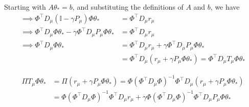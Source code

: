Starting with \( A \theta_{*} = b \), and substituting the definitions of \( A \) and \( b \), we have
\begin{align*}
    \implies
    \Phi^{\top} D_{\mu}\left(\mathbb{I}-\gamma P_{\mu}\right) \Phi \theta_{*}
     & =
    \Phi^{\top} D_{\mu} r_{\mu}
    \\
    \implies
    \Phi^{\top} D_{\mu} \Phi \theta_{*} - \gamma \Phi^{\top} D_{\mu} P_{\mu} \Phi \theta_{*}
     & =
    \Phi^{\top} D_{\mu} r_{\mu}
    \\
    \implies
    \Phi^{\top} D_{\mu} \Phi \theta_{*}
     & =
    \Phi^{\top} D_{\mu} r_{\mu} + \gamma \Phi^{\top} D_{\mu} P_{\mu} \Phi \theta_{*}
    \\ & =
    \Phi^{\top} D_{\mu} \left( r_{\mu} + \gamma P_{\mu} \Phi \theta_{*} \right)
    =
    \Phi^{\top} D_{\mu} T_{\mu} \Phi \theta_{*}
\end{align*}

\begin{align*}
    \Pi T_{\mu} \Phi \theta_{*}
     & =
    \Pi \left( r_{\mu} + \gamma P_{\mu} \Phi \theta_{*} \right)
    =
    \Phi{\left(\Phi^{\top} D_{\mu} \Phi\right)}^{-1} \Phi^{\top} D_{\mu} \left( r_{\mu} + \gamma P_{\mu} \Phi \theta_{*} \right)
    \\ & =
    \Phi{\left(\Phi^{\top} D_{\mu} \Phi\right)}^{-1} \Phi^{\top} D_{\mu} r_{\mu} + \gamma \Phi{\left(\Phi^{\top} D_{\mu} \Phi\right)}^{-1} \Phi^{\top} D_{\mu} P_{\mu} \Phi \theta_{*}
\end{align*}
